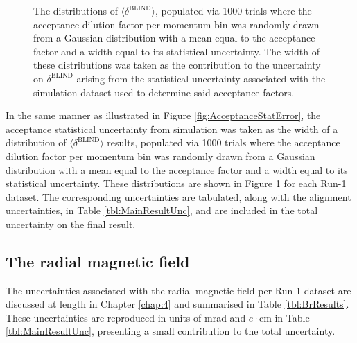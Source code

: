 \begin{figure}[t!]
\caption{The distributions of $\langle \delta^{\text{BLIND}} \rangle$, populated via 1000 trials where the acceptance dilution factor per momentum bin was randomly drawn from a Gaussian distribution with a mean equal to the acceptance factor and a width equal to its statistical uncertainty. The width of these distributions was taken as the contribution to the uncertainty on $\delta^{\text{BLIND}}$ arising from the statistical uncertainty associated with the simulation dataset used to determine said acceptance factors.}
\label{fig:AcceptanceStatErrorData}
\end{figure} 

In the same manner as illustrated in Figure \ref{fig:AcceptanceStatError}, the acceptance statistical uncertainty from simulation was taken as the width of a distribution of $\langle \delta^{\text{BLIND}} \rangle$ results, populated via 1000 trials where the acceptance dilution factor per momentum bin was randomly drawn from a Gaussian distribution with a mean equal to the acceptance factor and a width equal to its statistical uncertainty. These distributions are shown in Figure \ref{fig:AcceptanceStatErrorData} for each Run-1 dataset. The corresponding uncertainties are tabulated, along with the alignment uncertainties, in Table \ref{tbl:MainResultUnc}, and are included in the total uncertainty on the final result.

\subsection{The radial magnetic field}

The uncertainties associated with the radial magnetic field per Run-1 dataset are discussed at length in Chapter \ref{chap:4} and summarised in Table \ref{tbl:BrResults}. These uncertainties are reproduced in units of mrad and $e\cdot$cm in Table \ref{tbl:MainResultUnc}, presenting a small contribution to the total uncertainty. 

